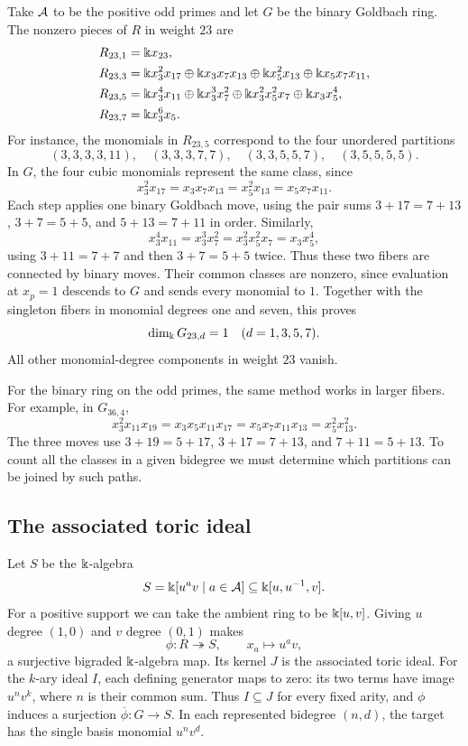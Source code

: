 \begin{example}
\label{setup:weight23}
Take $\mathcal A$ to be the positive odd primes and let $G$ be the binary
Goldbach ring. The nonzero pieces of $R$ in weight $23$ are
\begin{align*}
 R_{23,1}&=\Bbbk x_{23},\\
 R_{23,3}&=\Bbbk x_3^2x_{17}\oplus\Bbbk x_3x_7x_{13}
          \oplus\Bbbk x_5^2x_{13}\oplus\Bbbk x_5x_7x_{11},\\
 R_{23,5}&=\Bbbk x_3^4x_{11}\oplus\Bbbk x_3^3x_7^2
          \oplus\Bbbk x_3^2x_5^2x_7\oplus\Bbbk x_3x_5^4,\\
 R_{23,7}&=\Bbbk x_3^6x_5.
\end{align*}
For instance, the monomials in $R_{23,5}$ correspond to the four
unordered partitions
\[
 (3,3,3,3,11),\quad(3,3,3,7,7),\quad
 (3,3,5,5,7),\quad(3,5,5,5,5).
\]
In $G$, the four cubic monomials represent the same class, since
\begin{equation}\label{setup:weight23-cubic-moves}
 x_3^2x_{17}=x_3x_7x_{13}=x_5^2x_{13}=x_5x_7x_{11}.
\end{equation}
Each step applies one binary Goldbach move, using the pair sums
$3+17=7+13$, $3+7=5+5$, and $5+13=7+11$ in order. Similarly,
\[
 x_3^4x_{11}=x_3^3x_7^2=x_3^2x_5^2x_7=x_3x_5^4,
\]
using $3+11=7+7$ and then $3+7=5+5$ twice. Thus these two fibers
are connected by binary moves. Their common classes are nonzero,
since evaluation at $x_p=1$ descends to $G$ and sends every monomial
to $1$. Together with the singleton fibers in monomial degrees one and seven,
this proves
\[
 \dim_\Bbbk G_{23,d}=1\quad(d=1,3,5,7).
\]
All other monomial-degree components in weight $23$ vanish.
\end{example}

For the binary ring on the odd primes, the same method works in larger
fibers. For example, in $G_{36,4}$,
\[
 x_3^2x_{11}x_{19}
 =x_3x_5x_{11}x_{17}
 =x_5x_7x_{11}x_{13}
 =x_5^2x_{13}^2 .
\]
The three moves use $3+19=5+17$, $3+17=7+13$, and $7+11=5+13$.
To count all the classes in a given bidegree we must determine which
partitions can be joined by such paths.

\subsection{The associated toric ideal}
Let $S$ be the $\Bbbk$-algebra
\[
 S=\Bbbk[u^a v\mid a\in\mathcal A]\subseteq\Bbbk[u,u^{-1},v].
\]
For a positive support we can take the ambient ring to be $\Bbbk[u,v]$.
Giving $u$ degree $(1,0)$ and $v$ degree $(0,1)$ makes
\[
 \phi:R\twoheadrightarrow S,\qquad x_a\longmapsto u^a v,
\]
a surjective bigraded $\Bbbk$-algebra map. Its kernel $J$ is the
associated toric ideal. For the $k$-ary ideal $I$, each defining generator maps to zero:
its two terms have image $u^n v^k$, where $n$ is their common sum.
Thus $I\subseteq J$ for every fixed arity, and $\phi$ induces a
surjection $\overline\phi:G\to S$. In each represented bidegree
$(n,d)$, the target has the single basis monomial $u^n v^d$.

